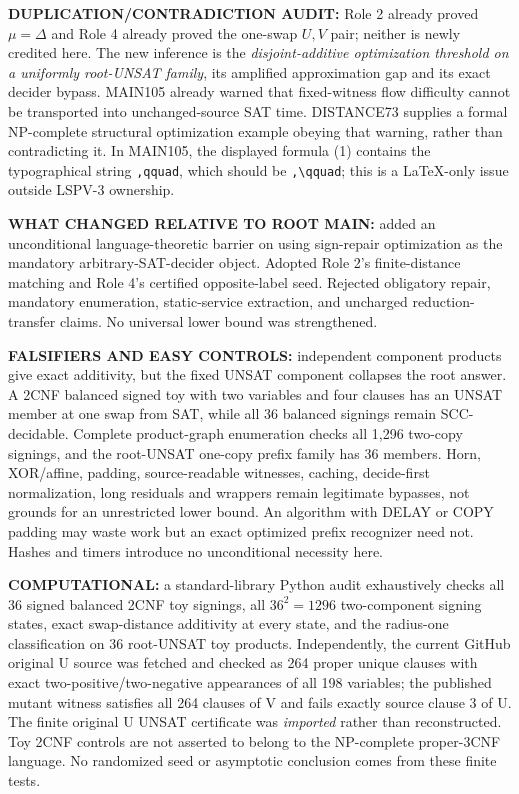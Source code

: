 \documentclass[11pt]{article}
\begin{document}
\textbf{DUPLICATION/CONTRADICTION AUDIT:} Role 2 already proved \(\mu=\Delta\) and Role 4 already proved the one-swap \(U,V\) pair; neither is newly credited here. The new inference is the \emph{disjoint-additive optimization threshold on a uniformly root-UNSAT family}, its amplified approximation gap and its exact decider bypass. MAIN105 already warned that fixed-witness flow difficulty cannot be transported into unchanged-source SAT time. DISTANCE73 supplies a formal NP-complete structural optimization example obeying that warning, rather than contradicting it. In MAIN105, the displayed formula (1) contains the typographical string \texttt{,qquad}, which should be \verb|,\qquad|; this is a LaTeX-only issue outside LSPV-3 ownership.

\textbf{WHAT CHANGED RELATIVE TO ROOT MAIN:} added an unconditional language-theoretic barrier on using sign-repair optimization as the mandatory arbitrary-SAT-decider object. Adopted Role 2's finite-distance matching and Role 4's certified opposite-label seed. Rejected obligatory repair, mandatory enumeration, static-service extraction, and uncharged reduction-transfer claims. No universal lower bound was strengthened.

\textbf{FALSIFIERS AND EASY CONTROLS:} independent component products give exact additivity, but the fixed UNSAT component collapses the root answer. A 2CNF balanced signed toy with two variables and four clauses has an UNSAT member at one swap from SAT, while all 36 balanced signings remain SCC-decidable. Complete product-graph enumeration checks all 1,296 two-copy signings, and the root-UNSAT one-copy prefix family has 36 members. Horn, XOR/affine, padding, source-readable witnesses, caching, decide-first normalization, long residuals and wrappers remain legitimate bypasses, not grounds for an unrestricted lower bound. An algorithm with DELAY or COPY padding may waste work but an exact optimized prefix recognizer need not. Hashes and timers introduce no unconditional necessity here.

\textbf{COMPUTATIONAL:} a standard-library Python audit exhaustively checks all 36 signed balanced 2CNF toy signings, all \(36^2=1296\) two-component signing states, exact swap-distance additivity at every state, and the radius-one classification on 36 root-UNSAT toy products. Independently, the current GitHub original U source was fetched and checked as 264 proper unique clauses with exact two-positive/two-negative appearances of all 198 variables; the published mutant witness satisfies all 264 clauses of V and fails exactly source clause 3 of U. The finite original U UNSAT certificate was \emph{imported} rather than reconstructed. Toy 2CNF controls are not asserted to belong to the NP-complete proper-3CNF language. No randomized seed or asymptotic conclusion comes from these finite tests.
\end{document}

